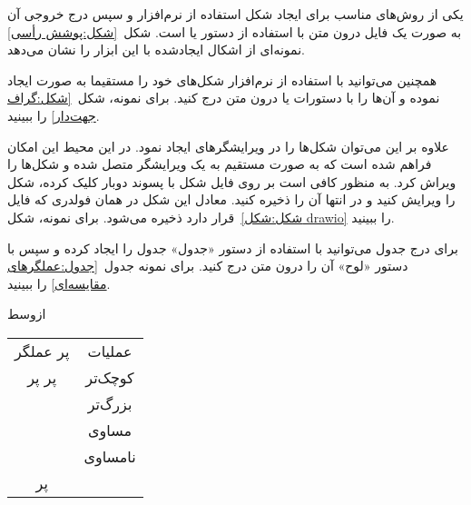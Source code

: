 
یکی از روش‌های مناسب برای ایجاد شکل استفاده از نرم‌افزار  و سپس
درج خروجی آن به صورت یک فایل  درون متن
با استفاده از دستور   یا  است. شکل~\ref{شکل:پوشش رأسی} نمونه‌ای از اشکال ایجادشده با این ابزار را نشان می‌دهد.

\begin{شکل}[ht]
\end{شکل}

\bigskip

همچنین می‌توانید با استفاده از نرم‌افزار  شکل‌های خود را مستقیما
به صورت  ایجاد نموده و آن‌ها را با دستورات  یا  
درون متن درج کنید. برای نمونه، شکل~\ref{شکل:گراف جهت‌دار} را ببینید.


\begin{شکل}[ht]
\end{شکل}

علاوه بر این می‌توان شکل‌ها را در ویرایشگرهای   ایجاد نمود. در این محیط این امکان فراهم شده است که به صورت مستقیم به یک ویرایشگر  متصل شده و شکل‌ها را ویراش کرد. به منظور کافی است بر روی فایل شکل با پسوند  دوبار کلیک کرده، شکل را ویرایش کنید و در انتها آن را ذخیره کنید. معادل  این شکل در همان فولدری که فایل  قرار دارد ذخیره می‌شود.
 برای نمونه، شکل~\ref{شکل:شکل drawio} را ببینید.

\begin{شکل}[ht]
\end{شکل}




برای درج جدول می‌توانید با استفاده از دستور  «جدول»
جدول را ایجاد کرده و سپس با دستور  «لوح»  آن را درون متن درج کنید.
برای نمونه جدول~\ref{جدول:عملگرهای مقایسه‌ای} را ببینید.

\vspace{1.5em}

\begin{لوح}[ht]
‌ازوسط

\begin{tabular}{|c|c|}
‌پر
 عملگر &  عملیات \\
‌پر ‌پر
\mycood{<} & کوچک‌تر \\
\mycood{>} & بزرگ‌تر \\
\mycood{==} &  مساوی \\
\mycood{<>} & نامساوی \\
‌پر
\end{tabular}

\end{لوح}



